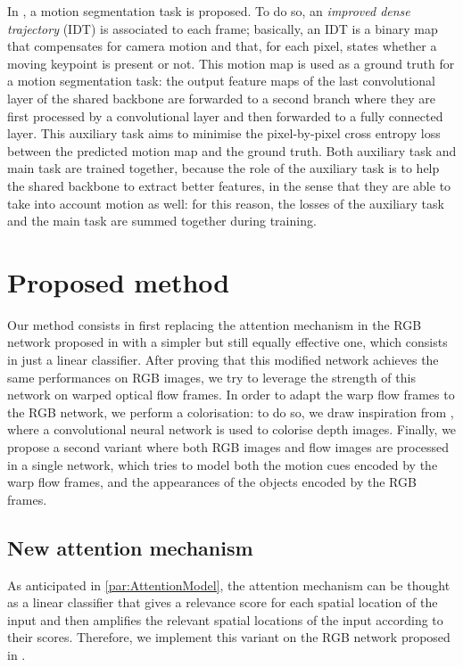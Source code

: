 \documentclass[10pt,twocolumn,letterpaper]{article}
\begin{document}
In \cite{planamente2020joint}, a motion segmentation task is proposed. To do so, an \textit{improved dense trajectory} (IDT) is associated to each frame; basically, an IDT is a binary map that compensates for camera motion and that, for each pixel, states whether a moving keypoint is present or not. This motion map is used as a ground truth for a motion segmentation task: the output feature maps of the last convolutional layer of the shared backbone are forwarded to a second branch where they are first processed by a convolutional layer and then forwarded to a fully connected layer. This auxiliary task aims to minimise the pixel-by-pixel cross entropy loss between the predicted motion map and the ground truth. Both auxiliary task and main task are trained together, because the role of the auxiliary task is to help the shared backbone to extract better features, in the sense that they are able to take into account motion as well: for this reason, the losses of the auxiliary task and the main task are summed together during training.


\section{Proposed method}
Our method consists in first replacing the attention mechanism in the RGB network proposed in \cite{Ego-RNN} with a simpler but still equally effective one, which consists in just a linear classifier. After proving that this modified network achieves the same performances on RGB images, we try to leverage the strength of this network on warped optical flow frames. In order to adapt the warp flow frames to the RGB network, we perform a colorisation: to do so, we draw inspiration from \cite{carlucci2017de2}, where a convolutional neural network is used to colorise depth images. Finally, we propose a second variant where both RGB images and flow images are processed in a single network, which tries to model both the motion cues encoded by the warp flow frames, and the appearances of the objects encoded by the RGB frames.

\subsection{New attention mechanism}
\label{par:new_am}

As anticipated in \ref{par:AttentionModel}, the attention mechanism can be thought as a linear classifier that gives a relevance score for each spatial location of the input and then amplifies the relevant spatial locations of the input according to their scores. Therefore, we implement this variant on the RGB network proposed in \cite{Ego-RNN}.
\end{document}
